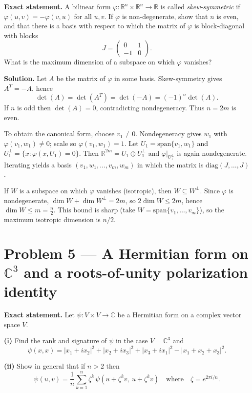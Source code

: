 \documentclass[12pt,a4paper]{article}
\theoremstyle{plain}
\theoremstyle{definition}      %
\begin{document}
\textbf{Exact statement.}
A bilinear form $\varphi:\mathbb R^n\times\mathbb R^n\to\mathbb R$ is called \emph{skew-symmetric} if $\varphi(u,v)=-\varphi(v,u)$ for all $u,v$.
If $\varphi$ is non-degenerate, show that $n$ is even, and that there is a basis with respect to which the matrix of $\varphi$ is block-diagonal with blocks
\[
J=\begin{pmatrix}0&1\\-1&0\end{pmatrix}.
\]
What is the maximum dimension of a subspace on which $\varphi$ vanishes?

\textbf{Solution.}
Let $A$ be the matrix of $\varphi$ in some basis. Skew-symmetry gives $A^T=-A$, hence
\[
\det(A)=\det(A^T)=\det(-A)=(-1)^n\det(A).
\]
If $n$ is odd then $\det(A)=0$, contradicting nondegeneracy. Thus $n=2m$ is even.

To obtain the canonical form, choose $v_1\neq 0$. Nondegeneracy gives $w_1$ with $\varphi(v_1,w_1)\neq 0$; scale so $\varphi(v_1,w_1)=1$.
Let $U_1=\mathrm{span}\{v_1,w_1\}$ and $U_1^\perp=\{x:\varphi(x,U_1)=0\}$.
Then $\mathbb R^{2m}=U_1\oplus U_1^\perp$ and $\varphi|_{U_1^\perp}$ is again nondegenerate.
Iterating yields a basis $(v_1,w_1,\dots,v_m,w_m)$ in which the matrix is $\mathrm{diag}(J,\dots,J)$.

If $W$ is a subspace on which $\varphi$ vanishes (isotropic), then $W\subseteq W^\perp$.
Since $\varphi$ is nondegenerate, $\dim W+\dim W^\perp=2m$, so $2\dim W\le 2m$, hence $\dim W\le m=\frac n2$.
This bound is sharp (take $W=\mathrm{span}\{v_1,\dots,v_m\}$), so the maximum isotropic dimension is $n/2$.


\section{Problem 5 — A Hermitian form on $\mathbb C^3$ and a roots-of-unity polarization identity}

\textbf{Exact statement.}
Let $\psi:V\times V\to\mathbb C$ be a Hermitian form on a complex vector space $V$.

\textbf{(i)} Find the rank and signature of $\psi$ in the case $V=\mathbb C^3$ and
\[
\psi(x,x)=|x_1+ix_2|^2+|x_2+ix_3|^2+|x_3+ix_1|^2-|x_1+x_2+x_3|^2.
\]

\textbf{(ii)} Show in general that if $n>2$ then
\[
\psi(u,v)=\frac1n\sum_{k=1}^n \zeta^k\,\psi(u+\zeta^k v,\ u+\zeta^k v)
\quad\text{where}\quad \zeta=e^{2\pi i/n}.
\]
\end{document}
